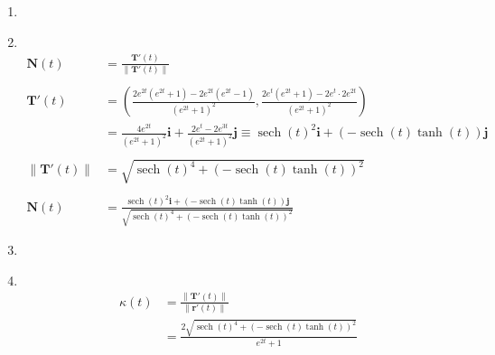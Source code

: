 \documentclass[11pt]{article}
\newcommand\Item[1][]{%
  \ifx\relax#1\relax  \item \else \item[#1] \fi
  \abovedisplayskip=0pt\abovedisplayshortskip=0pt~\vspace*{-\baselineskip}}
\begin{document}
\begin{enumerate}
\begin{enumerate}
              \Item
              \begin{align*}
                  \textbf{N}(t)                   & = \frac{\textbf{T}'(t)}{\| \textbf{T}'(t) \|}                                                                                                                                                                                                 \\\\
                  \textbf{T}'(t)                  & = \left(\frac{2e^{2t}\left(e^{2t}+1\right)-2e^{2t}\left(e^{2t}-1\right)}{\left(e^{2t}+1\right)^{2}},\frac{2e^{t}\left(e^{2t}+1\right)-2e^{t}\cdot2e^{2t}}{\left(e^{2t}+1\right)^{2}}\right)                                                   \\
                                                  & = \frac{4e^{2t}}{\left(e^{2t}+1\right)^{2}}\textbf{i} + \frac{2e^{t}-2e^{3t}}{\left(e^{2t}+1\right)^{2}}\textbf{j} \equiv \operatorname{sech}\left(t\right)^{2}\textbf{i} + (-\operatorname{sech}\left(t\right)\tanh\left(t\right))\textbf{j} \\\\
                  \left\| \textbf{T}'(t) \right\| & = \sqrt{\operatorname{sech}\left(t\right)^{4} + (-\operatorname{sech}\left(t\right)\tanh\left(t\right))^2}                                                                                                                                    \\\\
                  \textbf{N}(t)\                  & = \frac{\operatorname{sech}\left(t\right)^{2}\textbf{i} + (-\operatorname{sech}\left(t\right)\tanh\left(t\right))\textbf{j}}{\sqrt{\operatorname{sech}\left(t\right)^{4} + (-\operatorname{sech}\left(t\right)\tanh\left(t\right))^2}}
              \end{align*}

              \Item
              \begin{align*}
                  \kappa(t) & = \frac{\| \textbf{T}'(t) \|}{\| \textbf{r}'(t) \|}                                                                                         \\
                            & = \frac{2\sqrt{\operatorname{sech}\left(t\right)^{4} + (-\operatorname{sech}\left(t\right)\tanh\left(t\right))^2}}{e^{2t}+1               }
              \end{align*}


\end{enumerate}
\end{enumerate}
\end{document}
